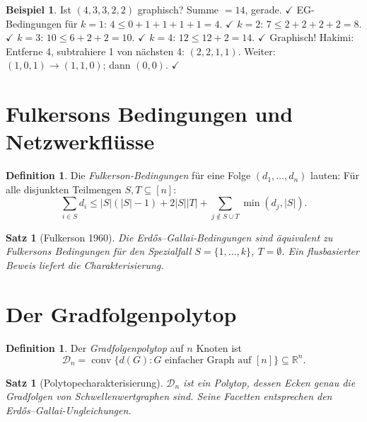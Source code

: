 \documentclass[12pt,a4paper]{amsart}
\newtheorem{satz}[theorem]{Satz}
\theoremstyle{definition}
\newtheorem{definition_de}[theorem]{Definition}
\newtheorem{example}[theorem]{Beispiel}
\theoremstyle{remark}
\newcommand{\R}{\mathbb{R}}
\begin{document}
\begin{example}
Ist $(4, 3, 3, 2, 2)$ graphisch?
Summe $= 14$, gerade. $\checkmark$
EG-Bedingungen für $k=1$: $4 \leq 0 + 1+1+1+1 = 4$. $\checkmark$
$k=2$: $7 \leq 2 + 2+2+2 = 8$. $\checkmark$
$k=3$: $10 \leq 6 + 2+2 = 10$. $\checkmark$
$k=4$: $12 \leq 12 + 2 = 14$. $\checkmark$
Graphisch! Hakimi: Entferne 4, subtrahiere 1 von nächsten 4: $(2,2,1,1)$.
Weiter: $(1,0,1) \to (1,1,0)$; dann $(0,0)$. $\checkmark$
\end{example}

\section{Fulkersons Bedingungen und Netzwerkflüsse}

\begin{definition_de}
Die \emph{Fulkerson-Bedingungen} für eine Folge $(d_1, \ldots, d_n)$ lauten:
Für alle disjunkten Teilmengen $S, T \subseteq [n]$:
\[
  \sum_{i \in S} d_i \leq |S|(|S|-1) + 2|S||T|
    + \sum_{j \notin S \cup T} \min(d_j, |S|).
\]
\end{definition_de}

\begin{satz}[Fulkerson 1960]
Die Erd\H{o}s--Gallai-Bedingungen sind äquivalent zu Fulkersons Bedingungen
für den Spezialfall $S = \{1, \ldots, k\}$, $T = \emptyset$.
Ein flusbasierter Beweis liefert die Charakterisierung.
\end{satz}

\section{Der Gradfolgenpolytop}

\begin{definition_de}
Der \emph{Gradfolgenpolytop} auf $n$ Knoten ist
\[
  \mathcal{D}_n = \operatorname{conv}\{d(G) : G \text{ einfacher Graph auf } [n]\}
  \subseteq \R^n.
\]
\end{definition_de}

\begin{satz}[Polytopecharakterisierung]
$\mathcal{D}_n$ ist ein Polytop, dessen Ecken genau die Gradfolgen von
Schwellenwertgraphen sind.
Seine Facetten entsprechen den Erd\H{o}s--Gallai-Ungleichungen.
\end{satz}
\end{document}
